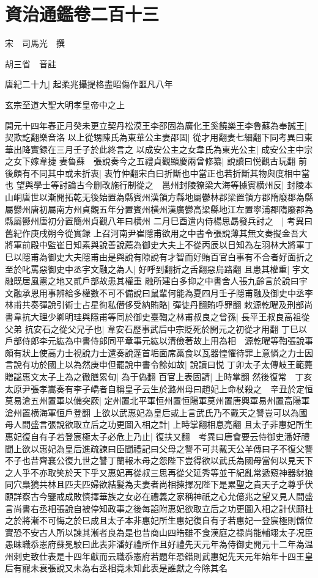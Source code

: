 \section{資治通鑑卷二百十三}
宋　司馬光　撰

胡三省　音註

唐紀二十九|{
	起柔兆攝提格盡昭傷作噩凡八年}


玄宗至道大聖大明孝皇帝中之上

開元十四年春正月癸未更立契丹松漠王李邵固為廣化王奚饒樂王李魯蘇為奉誠王|{
	契欺訖翻樂音洛}
以上從甥陳氏為東華公主妻邵固|{
	從才用翻妻七細翻下同考異曰東華出降實録在三月壬子於此終言之}
以成安公主之女韋氏為東光公主|{
	成安公主中宗之女下嫁韋捷}
妻魯蘇　張說奏今之五禮貞觀顯慶兩曾修纂|{
	說讀曰悦觀古玩翻}
前後頗有不同其中或未折衷|{
	衷竹仲翻宋白曰折斷也中當正也若折斷其物與度相中當也}
望與學士等討論古今删改施行制從之　邕州封陵獠梁大海等據賓横州反|{
	封陵本山峒唐世以漸開拓乾无後始置為縣賓州漢領方縣地屬鬱林郡梁置領方郡隋廢郡為縣屬鬰州唐初屬南方州貞觀五年分置賓州横州漢廣鬰高梁縣地江左置寜浦郡隋廢郡為縣屬鬰州唐初分置簡州貞觀八年曰横州}
二月巳酉遣内侍楊思勗發兵討之　|{
	考異曰舊紀作庚戌朔今從實録}
上召河南尹崔隱甫欲用之中書令張說薄其無文奏擬金吾大將軍前殿中監崔日知素與說善說薦為御史大夫上不從丙辰以日知為左羽林大將軍丁巳以隱甫為御史大夫隱甫由是與說有隙說有才智而好賄百官白事有不合者好面折之至於叱罵惡御史中丞宇文融之為人|{
	好呼到翻折之舌翻惡烏路翻}
且患其權重|{
	宇文融既居風憲之地又貳戶部故患其權重}
融所建白多抑之中書舍人張九齡言於說曰宇文融承恩用事辨給多權數不可不備說曰鼠輩何能為夏四月壬子隱甫融及御史中丞李林甫共奏彈說引術士占星徇私僭侈受納賄賂|{
	彈徒丹翻賄呼罪翻}
敕源乾曜及刑部尚書韋抗大理少卿明珪與隱甫等同於御史臺鞫之林甫叔良之曾孫|{
	長平王叔良高祖從父弟}
抗安石之從父兄子也|{
	韋安石歷事武后中宗貶死於開元之初從才用翻}
丁巳以戶部侍郎李元紘為中書侍郎同平章事元紘以清儉著故上用為相　源乾曜等鞫張說事頗有狀上使高力士視說力士還奏說蓬首垢面席藁食以瓦器惶懼待罪上意憐之力士因言說有功於國上以為然庚申但罷說中書令餘如故|{
	說讀曰悦}
丁卯太子太傳岐王範薨贈諡惠文太子上為之徹膳累旬|{
	為于偽翻}
百官上表固請|{
	上時掌翻}
然後復常　丁亥太原尹張孝嵩奏有李子嶠者自稱皇子云生於潞州母曰趙妃上命杖殺之　辛丑於定恒莫易滄五州置軍以備突厥|{
	定州置北平軍恒州置恒陽軍莫州置唐興軍易州置高陽軍滄州置横海軍恒戶登翻}
上欲以武惠妃為皇后或上言武氏乃不戴天之讐豈可以為國母人間盛言張說欲取立后之功更圖入相之計|{
	上時掌翻相息亮翻}
且太子非惠妃所生惠妃復自有子若登宸極太子必危上乃止|{
	復扶又翻　考異曰唐會要云侍御史潘好禮聞上欲以惠妃為皇后進疏諫曰臣聞禮記曰父母之讐不可共戴天公羊傳曰子不復父讐不子也昔齊襄公復九世之讐丁蘭報木母之怨陛下豈得欲以武氏為國母當何以見天下之人乎不亦取笑於天下乎又惠妃再從叔三思再從父延秀等並干紀亂常遞窺神器豺狼同穴梟獍共林且匹夫匹婦欲結髪為夫妻者尚相揀擇况陛下是累聖之貴天子之尊乎伏願詳察古今鑒戒成敗慎擇華族之女必在禮義之家稱神祇之心允億兆之望又見人間盛言尚書右丞相張說自被停知政事之後每諂附惠妃欲取立后之功更圖入相之計伏願杜之於將漸不可悔之於巳成且太子本非惠妃所生惠妃復自有子若惠妃一登宸極則儲位實恐不安古人所以諫其漸者良為是也昔商山四皓雖不食漢庭之禄尚能輔翊太子况臣愚昧職忝憲府蘇冕駮曰此表非潘好禮所作且好禮先天元年為侍御史開元十二年為温州刺史致仕表是十四年獻而云職忝憲府若題年恐錯則武惠妃先天元年始年十四王皇后有寵未衰張說又未為右丞相竟未知此表是誰獻之今除其名}
